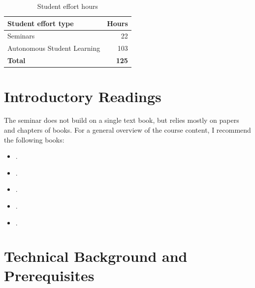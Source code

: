 \documentclass[abstract=on,parskip=full,headings=standardclasses,fontsize=11pt,paper=a4]{scrartcl}
\begin{document}

\begin{table}[h] \centering \onehalfspacing
\caption*{Student effort hours}
\begin{tabular}{ l r} 
\toprule
Student effort type &  Hours \\
\midrule
Seminars & 22 \\
Autonomous Student Learning  & 103 \\
\textbf{Total} & \textbf{125} \\
\bottomrule
\end{tabular}
\end{table}




\section*{Introductory Readings}

The seminar does not build on a single text book, but relies mostly on papers and chapters of books. For  a general overview of the course content, I recommend the following books:

\begin{itemize}
\item {}.
\item {}.
\item {}.
\item {}.
\item {}.
\end{itemize}




\section*{Technical Background and Prerequisites}
\end{document}

